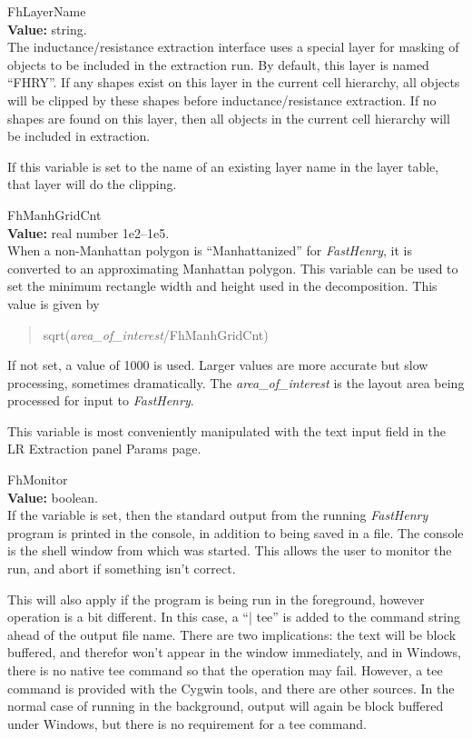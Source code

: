 \begin{description}
\item{\et FhLayerName}\\
{\bf Value:} string.\\
The inductance/resistance extraction interface uses a special layer
for masking of objects to be included in the extraction run.  By
default, this layer is named ``{\vt FHRY}''.  If any shapes exist on
this layer in the current cell hierarchy, all objects will be clipped
by these shapes before inductance/resistance extraction.  If no shapes
are found on this layer, then all objects in the current cell
hierarchy will be included in extraction.

If this variable is set to the name of an existing layer name in the
layer table, that layer will do the clipping.

\item{\et FhManhGridCnt}\\
{\bf Value:} real number 1e2--1e5.\\
When a non-Manhattan polygon is ``Manhattanized'' for {\it FastHenry},
it is converted to an approximating Manhattan polygon.  This variable
can be used to set the minimum rectangle width and height used in the
decomposition.  This value is given by
\begin{quote}
{\vt sqrt(}{\it area\_of\_interest\/}{\vt /FhManhGridCnt)}
\end{quote}
If not set, a value of 1000 is used.  Larger values are more accurate
but slow processing, sometimes dramatically.  The {\it
area\_of\_interest} is the layout area being processed for input to
{\it FastHenry}.

This variable is most conveniently manipulated with the text input
field in the {\cb LR Extraction} panel {\cb Params} page.

\item{\et FhMonitor}\\
{\bf Value:} boolean.\\
If the variable is set, then the standard output from the running {\it
FastHenry} program is printed in the console, in addition to being
saved in a file.  The console is the shell window from which {\Xic}
was started.  This allows the user to monitor the run, and abort if
something isn't correct.

This will also apply if the program is being run in the foreground,
however operation is a bit different.  In this case, a ``{\vt | tee}''
is added to the command string ahead of the output file name.  There
are two implications:  the text will be block buffered, and therefor
won't appear in the window immediately, and in Windows, there is no
native {\vt tee} command so that the operation may fail.  However, a
{\vt tee} command is provided with the Cygwin tools, and there are
other sources.  In the normal case of running in the background,
output will again be block buffered under Windows, but there is no
requirement for a {\vt tee} command.


\end{description}
